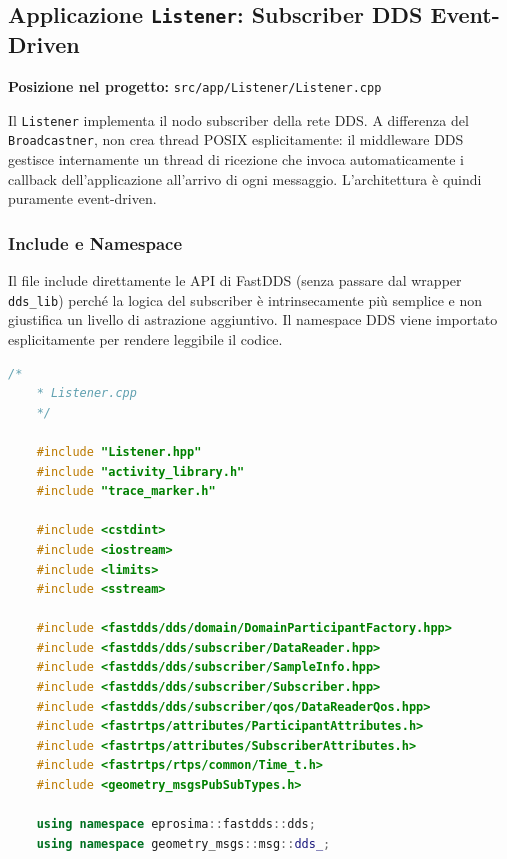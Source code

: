 \subsection{Applicazione \texttt{Listener}: Subscriber DDS Event-Driven}

\noindent\textbf{Posizione nel progetto:} \texttt{src/app/Listener/Listener.cpp}

\bigskip

Il \texttt{Listener} implementa il nodo subscriber della rete DDS. A differenza del
\texttt{Broadcastner}, non crea thread POSIX esplicitamente: il middleware DDS
gestisce internamente un thread di ricezione che invoca automaticamente i callback
dell'applicazione all'arrivo di ogni messaggio. L'architettura è quindi
puramente event-driven.

\subsubsection{Include e Namespace}

Il file include direttamente le API di FastDDS (senza passare dal wrapper
\texttt{dds\_lib}) perché la logica del subscriber è intrinsecamente più semplice
e non giustifica un livello di astrazione aggiuntivo. Il namespace DDS viene
importato esplicitamente per rendere leggibile il codice.

\begin{lstlisting}[language=C++, caption={\texttt{Listener.cpp} -- Include e namespace}]
	/*
	* Listener.cpp
	*/
	
	#include "Listener.hpp"
	#include "activity_library.h"
	#include "trace_marker.h"
	
	#include <cstdint>
	#include <iostream>
	#include <limits>
	#include <sstream>
	
	#include <fastdds/dds/domain/DomainParticipantFactory.hpp>
	#include <fastdds/dds/subscriber/DataReader.hpp>
	#include <fastdds/dds/subscriber/SampleInfo.hpp>
	#include <fastdds/dds/subscriber/Subscriber.hpp>
	#include <fastdds/dds/subscriber/qos/DataReaderQos.hpp>
	#include <fastrtps/attributes/ParticipantAttributes.h>
	#include <fastrtps/attributes/SubscriberAttributes.h>
	#include <fastrtps/rtps/common/Time_t.h>
	#include <geometry_msgsPubSubTypes.h>
	
	using namespace eprosima::fastdds::dds;
	using namespace geometry_msgs::msg::dds_;
\end{lstlisting}

